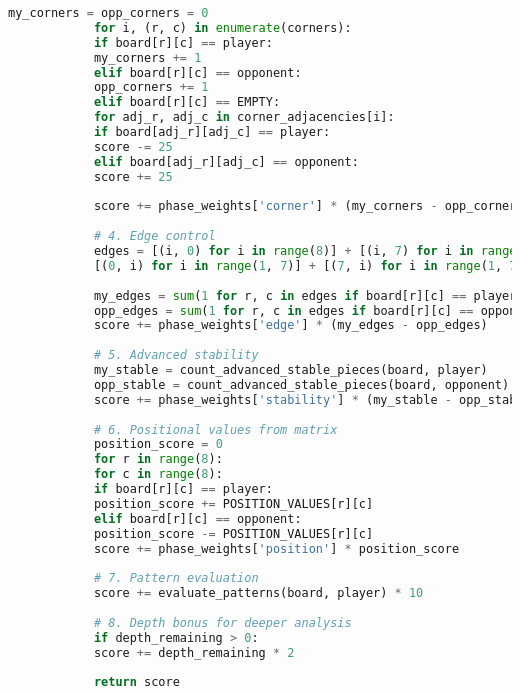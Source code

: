 \documentclass[12pt]{article}
\newenvironment{ltrcode}{\lr\bgroup}{\egroup}
\begin{document}
\begin{ltrcode}
\begin{lstlisting}[language=Python, caption=Complete Advanced Evaluation Function]
			my_corners = opp_corners = 0
			for i, (r, c) in enumerate(corners):
			if board[r][c] == player:
			my_corners += 1
			elif board[r][c] == opponent:
			opp_corners += 1
			elif board[r][c] == EMPTY:
			for adj_r, adj_c in corner_adjacencies[i]:
			if board[adj_r][adj_c] == player:
			score -= 25
			elif board[adj_r][adj_c] == opponent:
			score += 25
			
			score += phase_weights['corner'] * (my_corners - opp_corners)
			
			# 4. Edge control
			edges = [(i, 0) for i in range(8)] + [(i, 7) for i in range(8)] + \
			[(0, i) for i in range(1, 7)] + [(7, i) for i in range(1, 7)]
			
			my_edges = sum(1 for r, c in edges if board[r][c] == player)
			opp_edges = sum(1 for r, c in edges if board[r][c] == opponent)
			score += phase_weights['edge'] * (my_edges - opp_edges)
			
			# 5. Advanced stability
			my_stable = count_advanced_stable_pieces(board, player)
			opp_stable = count_advanced_stable_pieces(board, opponent)
			score += phase_weights['stability'] * (my_stable - opp_stable)
			
			# 6. Positional values from matrix
			position_score = 0
			for r in range(8):
			for c in range(8):
			if board[r][c] == player:
			position_score += POSITION_VALUES[r][c]
			elif board[r][c] == opponent:
			position_score -= POSITION_VALUES[r][c]
			score += phase_weights['position'] * position_score
			
			# 7. Pattern evaluation
			score += evaluate_patterns(board, player) * 10
			
			# 8. Depth bonus for deeper analysis
			if depth_remaining > 0:
			score += depth_remaining * 2
			
			return score
		\end{lstlisting}
	\end{ltrcode}
\end{document}

